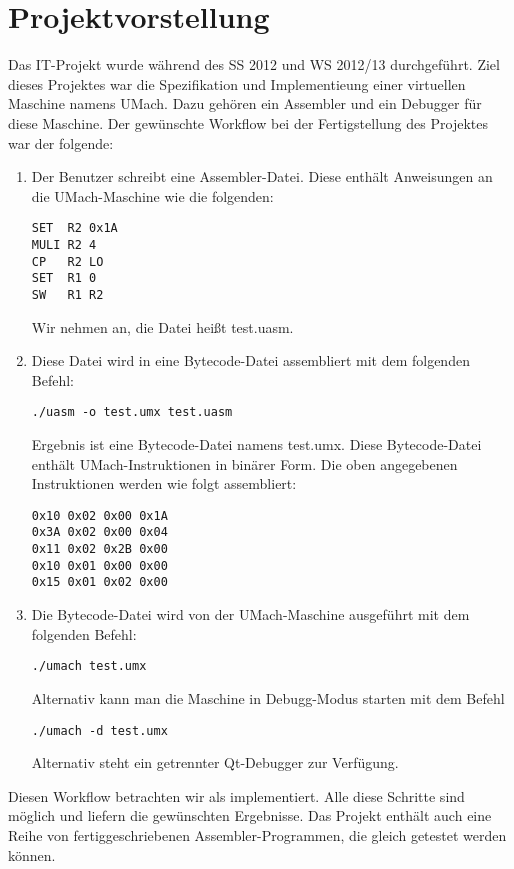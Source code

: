 \section{Projektvorstellung}

Das IT-Projekt wurde während des SS 2012 und WS 2012/13 durchgeführt. Ziel
dieses Projektes war die Spezifikation und Implementieung einer virtuellen
Maschine namens UMach. Dazu gehören ein Assembler und ein Debugger für diese
Maschine. Der gewünschte Workflow bei der Fertigstellung des Projektes war der
folgende:

\begin{enumerate}
\item Der Benutzer schreibt eine Assembler-Datei. Diese enthält Anweisungen an
die UMach-Maschine wie die folgenden:
\begin{lstlisting}
SET  R2 0x1A
MULI R2 4
CP   R2 LO
SET  R1 0
SW   R1 R2
\end{lstlisting}
Wir nehmen an, die Datei heißt \glqq{}test.uasm\grqq{}.

\item Diese Datei wird in eine Bytecode-Datei assembliert mit dem folgenden
Befehl:
\begin{lstlisting}
./uasm -o test.umx test.uasm
\end{lstlisting}
Ergebnis ist eine Bytecode-Datei namens \glqq{}test.umx\grqq{}. Diese
Bytecode-Datei enthält UMach-Instruktionen in binärer Form. Die oben angegebenen
Instruktionen werden wie folgt assembliert:
\begin{lstlisting}
0x10 0x02 0x00 0x1A
0x3A 0x02 0x00 0x04
0x11 0x02 0x2B 0x00
0x10 0x01 0x00 0x00
0x15 0x01 0x02 0x00
\end{lstlisting}

\item Die Bytecode-Datei wird von der UMach-Maschine ausgeführt mit dem
folgenden Befehl:
\begin{lstlisting}
./umach test.umx
\end{lstlisting}
Alternativ kann man die Maschine in Debugg-Modus starten mit dem Befehl
\begin{lstlisting}
./umach -d test.umx
\end{lstlisting}
Alternativ steht ein getrennter Qt-Debugger zur Verfügung.
\end{enumerate}

Diesen Workflow betrachten wir als implementiert. Alle diese Schritte sind
möglich und liefern die gewünschten Ergebnisse. Das Projekt enthält auch eine
Reihe von fertiggeschriebenen Assembler-Programmen, die gleich getestet werden
können.


